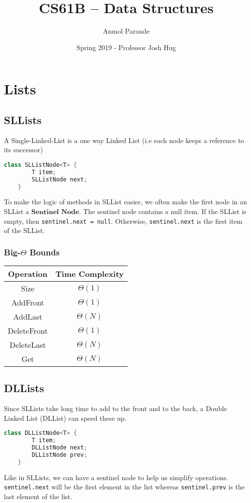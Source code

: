 \documentclass{article}
\begin{document}
    \title{CS61B -- Data Structures}
    \author{Anmol Parande}
    \date{Spring 2019 - Professor Josh Hug}
\maketitle
\tableofcontents
\section{Lists}
\subsection{SLLists}
A Single-Linked-List is a one way Linked List (i.e each node keeps a reference to its successor)
\begin{lstlisting}[language=Java]
    class SLListNode<T> {
        T item;
        SLListNode next;
    }
\end{lstlisting}
To make the logic of methods in SLList easier, we often make the first node in an SLList a $\textbf{Sentinel Node}$.
The sentinel node contains a null item. If the SLList is empty, then \lstinline{sentinel.next = null}.
Otherwise, \lstinline{sentinel.next} is the first item of the SLList.
\subsubsection{Big-$\Theta$ Bounds}
\begin{center}
    \begin{tabular}{ c | c }
     Operation & Time Complexity\\
     \hline
     Size & $\Theta(1)$\\ 
     AddFront & $\Theta(1)$\\  
     AddLast & $\Theta(N)$\\
     DeleteFront & $\Theta(1)$\\
     DeleteLast & $\Theta(N)$\\
     Get & $\Theta(N)$
    \end{tabular}
\end{center}
\subsection{DLLists}
Since SLLists take long time to add to the front and to the back, a Double Linked List (DLList) can speed these up.
\begin{lstlisting}[language=Java]
    class DLListNode<T> {
        T item;
        DLListNode next;
        DLListNode prev;
    }
\end{lstlisting}
Like in SLLists, we can have a sentinel node to help us simplify operations.
\lstinline{sentinel.next} will be the first element in the list whereas \lstinline{sentinel.prev} is the last element of the list.
\end{document}
